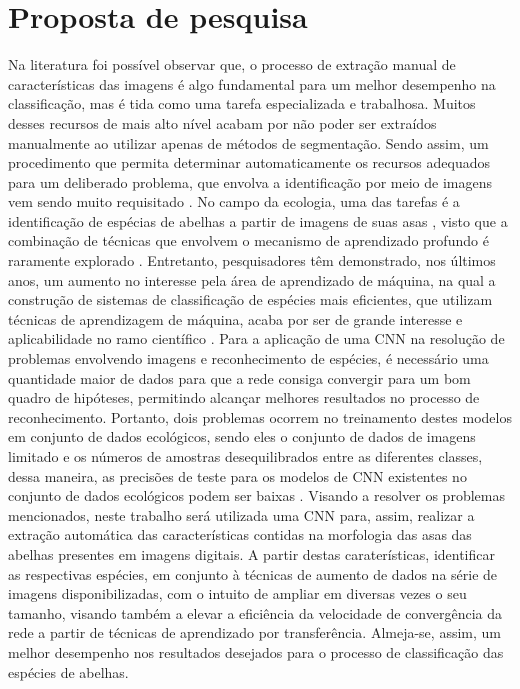 \documentclass[
	12pt,				%
	oneside,			%
	a4paper,			%
	english,			%
	brazil				%
	]{abntex2ppgsi}
\begin{document}
\chapter{Proposta de pesquisa}
Na literatura foi possível observar que, o processo de extração manual de características das imagens é algo fundamental para um melhor desempenho na classificação, mas é tida como uma tarefa especializada e trabalhosa. Muitos desses recursos de mais alto nível acabam por não poder ser extraídos manualmente ao utilizar apenas de métodos de segmentação. Sendo assim, um procedimento que permita determinar automaticamente os recursos adequados para um deliberado problema, que envolva a identificação por meio de imagens vem sendo muito requisitado  \cite{waldchen2018machine}. No campo da ecologia, uma das tarefas é a identificação de espécias de abelhas a partir de imagens de suas asas \cite{liu2020classification}, visto que a combinação de técnicas que envolvem o mecanismo de aprendizado profundo é raramente explorado \cite{liu2020classification}. Entretanto, pesquisadores têm demonstrado, nos últimos anos, um aumento no interesse pela área de aprendizado de máquina, na qual a construção de sistemas de classificação de espécies mais eficientes, que utilizam técnicas de aprendizagem de máquina, acaba por ser de grande interesse e aplicabilidade no ramo científico \cite{liu2020classification}. Para a aplicação de uma CNN na resolução de problemas envolvendo imagens e reconhecimento de espécies, é necessário uma quantidade maior de dados para que a rede consiga convergir para um bom quadro de hipóteses, permitindo alcançar melhores resultados no processo de reconhecimento. Portanto, dois problemas ocorrem no treinamento destes modelos em conjunto de dados ecológicos, sendo eles o conjunto de dados de imagens limitado e os números de amostras desequilibrados entre as diferentes classes, dessa maneira, as precisões de teste para os modelos de CNN existentes no conjunto de dados ecológicos podem ser baixas \cite{liu2020classification}. Visando a resolver os problemas mencionados, neste trabalho será utilizada uma CNN para, assim, realizar a extração automática das características contidas na morfologia das asas das abelhas presentes em imagens digitais. A partir destas caraterísticas, identificar as respectivas espécies, em conjunto à técnicas de aumento de dados na série de imagens disponibilizadas, com o intuito de ampliar em diversas vezes o seu tamanho, visando também a elevar a eficiência da velocidade de convergência da rede a partir de técnicas de aprendizado por transferência. Almeja-se, assim, um melhor desempenho nos resultados desejados para o processo de classificação das espécies de abelhas.
\end{document}
